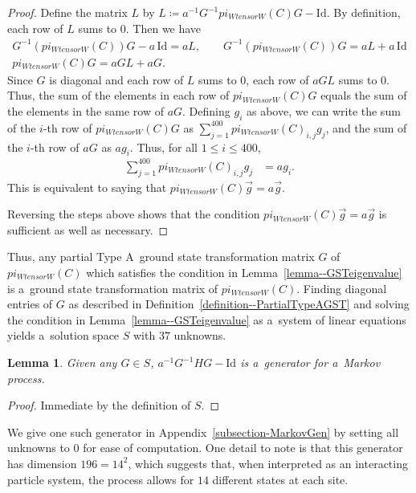 \documentclass[10pt,a4paper]{amsart}
\numberwithin{equation}{section}
\newtheorem{Lemma}[Theorem]{Lemma}
\theoremstyle{definition}
\def\mathcal#1{#1}
\def\pi{pi}
\def\otimes{ tensor }
\begin{document}
\begin{proof}
 Define the matrix $L$ by $ L \coloneqq a^{-1}G^{-1}\pi_{W \otimes W}(C)G - \mathrm{Id}$.
 By definition, each row of $L$ sums to $0$. Then we have
 \begin{gather*}
 G^{-1}(\pi_{W \otimes W}(C))G - a\,\mathrm{Id} = aL ,\qquad
 G^{-1}(\pi_{W \otimes W}(C))G = aL + a\,\mathrm{Id} \\
 \pi_{W \otimes W}(C)G = aGL + aG.
 \end{gather*}
 Since $G$ is diagonal and each row of $L$ sums to $0$, each row of $aGL$ sums to $0$. Thus, the sum of the elements in each row of $\pi_{W \otimes W}(C) G$ equals the sum of the elements in the same row of $aG$. Defining $g_i$ as above, we can write the sum of the $i$-th row of $\pi_{W \otimes W}(C)G$ as $\sum_{j=1}^{400} \pi_{W \otimes W}(C)_{i,j} g_j$, and the sum of the $i$-th row of $aG$ as $ag_i$. Thus, for all $1 \le i \le 400$,
 \begin{align*}
 \sum_{j=1}^{400} \pi_{W \otimes W}(C)_{i,j} g_j &= ag_i.
 \end{align*}
 This is equivalent to saying that $\pi_{W \otimes W}(C) \vec{g} = a\vec{g}$.

 Reversing the steps above shows that the condition $\pi_{W \otimes W}(C)\vec{g} = a\vec{g}$ is sufficient as well as necessary.
\end{proof}

Thus, any partial Type A~ground state transformation matrix $G$ of $\pi_{W \otimes W}(C)$ which satisfies the condition in Lemma~\ref{lemma--GSTeigenvalue} is a~ground state transformation matrix of $\pi_{W \otimes W}(C)$. Finding diagonal entries of $G$ as described in Definition~\ref{definition--PartialTypeAGST} and solving the condition in Lemma~\ref{lemma--GSTeigenvalue} as a~system of linear equations yields a~solution space $\mathcal{S}$ with $37$ unknowns.

\begin{Lemma}
 Given any $G \in \mathcal{S}$, $a^{-1}G^{-1}HG - \mathrm{Id}$ is a~generator for a~Markov process.
\end{Lemma}
\begin{proof}
 Immediate by the definition of $\mathcal{S}$.
\end{proof}
We give one such generator in Appendix~\ref{subsection-MarkovGen} by setting all unknowns to $0$ for ease of computation. One detail to note is that this generator has dimension $196 = 14^2$, which suggests that, when interpreted as an interacting particle system, the process allows for $14$ different states at each site.
\end{document}
